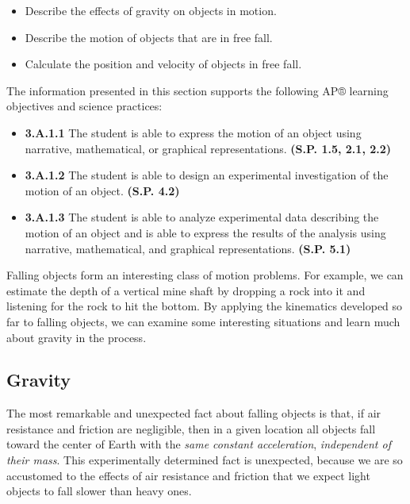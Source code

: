 \documentclass[
]{book}
\providecommand{\tightlist}{%
  \setlength{\itemsep}{0pt}\setlength{\parskip}{0pt}}
\begin{document}
\begin{itemize}
\tightlist
\item
  Describe the effects of gravity on objects in motion.
\item
  Describe the motion of objects that are in free fall.
\item
  Calculate the position and velocity of objects in free fall.
\end{itemize}

The information presented in this section supports the following AP®
learning objectives and science practices:

\begin{itemize}
\tightlist
\item
  \textbf{3.A.1.1} The student is able to express the motion of an object
  using narrative, mathematical, or graphical representations. \textbf{(S.P.
  1.5, 2.1, 2.2)}
\item
  \textbf{3.A.1.2} The student is able to design an experimental
  investigation of the motion of an object. \textbf{(S.P. 4.2)}
\item
  \textbf{3.A.1.3} The student is able to analyze experimental data
  describing the motion of an object and is able to express the
  results of the analysis using narrative, mathematical, and graphical
  representations. \textbf{(S.P. 5.1)}
\end{itemize}

Falling objects form an interesting class of motion problems. For
example, we can estimate the depth of a vertical mine shaft by dropping
a rock into it and listening for the rock to hit the bottom. By applying
the kinematics developed so far to falling objects, we can examine some
interesting situations and learn much about gravity in the process.

\hypertarget{fs-id4178141}{}
\hypertarget{gravity}{%
\subsection{Gravity}\label{gravity}}

The most remarkable and unexpected fact about falling objects is that,
if air resistance and friction are negligible, then in a given location
all objects fall toward the center of Earth with the \emph{same constant
acceleration}, \emph{independent of their mass}. This experimentally
determined fact is unexpected, because we are so accustomed to the
effects of air resistance and friction that we expect light objects to
fall slower than heavy ones.
\end{document}

